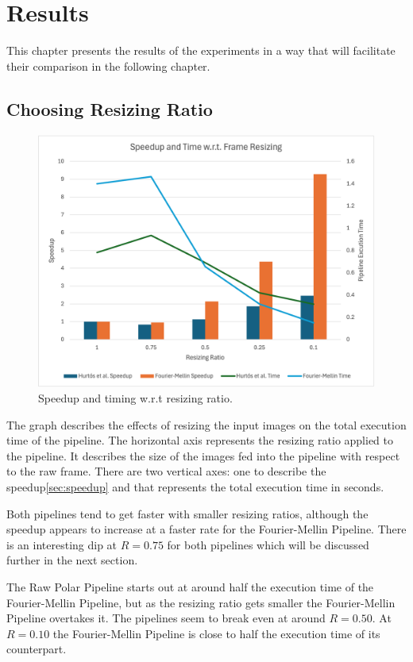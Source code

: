 \chapter{Results}
\label{chap:results}

This chapter presents the results of the experiments in a way that will facilitate their comparison in the following chapter.

\section{Choosing Resizing Ratio}

\begin{figure}[H]
  \centering
  \includegraphics[width=.7\textwidth]{figures/results/Resizing.png}
  \caption{Speedup and timing w.r.t resizing ratio.}
  \label{fig:resizing-speedup}
\end{figure}

The graph describes the effects of resizing the input images on the total execution time of the pipeline. The horizontal axis represents the resizing ratio applied to the pipeline. It describes the size of the images fed into the pipeline with respect to the raw frame. There are two vertical axes: one to describe the speedup\ref{sec:speedup} and that represents the total execution time in seconds.

Both pipelines tend to get faster with smaller resizing ratios, although the speedup appears to increase at a faster rate for the Fourier-Mellin Pipeline. There is an interesting dip at \(R = 0.75\) for both pipelines which will be discussed further in the next section. 

The Raw Polar Pipeline starts out at around half the execution time of the Fourier-Mellin Pipeline, but as the resizing ratio gets smaller the Fourier-Mellin Pipeline overtakes it. The pipelines seem to break even at around \(R = 0.50\). At \(R = 0.10\) the Fourier-Mellin Pipeline is close to half the execution time of its counterpart.

